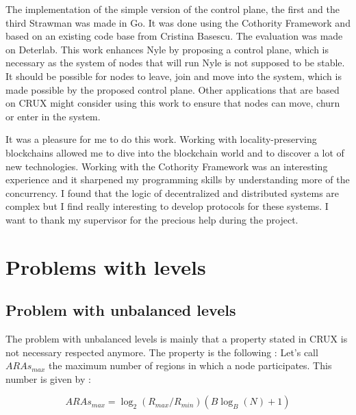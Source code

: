 \documentclass[a4paper,11pt,oneside]{report}
\begin{document}

The implementation of the simple version of the control plane, the first and
the third Strawman was made in Go. It was done using the Cothority Framework
and based on an existing code base from Cristina Basescu. The evaluation was
made on Deterlab. This work enhances Nyle by proposing a control plane, which
is necessary as the system of nodes that will run Nyle is not supposed to be
stable. It should be possible for nodes to leave, join and move into the
system, which is made possible by the proposed control plane. Other
applications that are based on CRUX \cite{Basescu2014} might consider using
this work to ensure that nodes can move, churn or enter in the system.

It was a pleasure for me to do this work. Working with locality-preserving
blockchains allowed me to dive into the blockchain world and to discover a lot
of new technologies. Working with the Cothority Framework was an interesting
experience and it sharpened my programming skills by understanding more of the
concurrency. I found that the logic of decentralized and distributed systems
are complex but I find really interesting to develop protocols for these
systems. I want to thank my supervisor for the precious help during the
project.


\cleardoublepage {} {}
\printbibliography


\appendix %

\chapter{Problems with levels}

\section{Problem with unbalanced levels } \label{app:unbalanced-levels}
The problem with unbalanced levels is mainly that a property stated in CRUX
\cite{Basescu2014} is not necessary respected anymore. The property is the
following : Let's call $ARAs_{max}$ the maximum number of regions in which a
node participates. This number is given by : 

\begin{equation} \label{eq:ARAmax}
ARAs_{max} = \log_2(R_{max}/R_{min}) (B \log_B(N)+1)
\end{equation}
\end{document}
